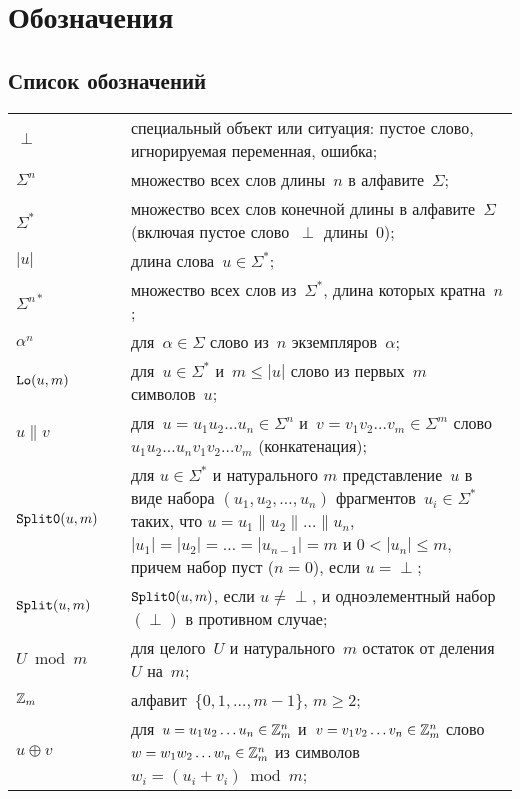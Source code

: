 \chapter{Обозначения}\label{DEFS}

\section{Список обозначений}\label{DEFS.List}

{\tabcolsep 0pt
\begin{longtable}{lrp{13.2cm}}
$\perp$  & \hspace{2mm} &
специальный объект или ситуация: 
пустое слово, игнорируемая переменная, ошибка;
\\[4pt]
%
$\Sigma^n$  &&
множество всех слов длины~$n$ в алфавите~$\Sigma$;
\\[4pt]
%
$\Sigma^*$ &&
множество всех слов конечной длины в алфавите~$\Sigma$
(включая пустое слово~$\perp$ длины~$0$);
\\[4pt]
$|u|$ &&
длина слова~$u\in\Sigma^*$;
\\[4pt]
%
$\Sigma^{n*}$ &&
множество всех слов из~$\Sigma^*$, длина которых кратна~$n$;
\\[4pt]
%
$\alpha^n$ &&
для~$\alpha\in\Sigma$ слово из~$n$ экземпляров~$\alpha$;
\\[4pt]
%
$\mathop{\texttt{Lo}}\nolimits(u,m)$ &&
для~$u\in\Sigma^*$ и~$m\leq|u|$
слово из первых~$m$ символов~$u$;
\\[4pt]
%
$u\parallel v$ &&
для~$u=u_1 u_2\ldots u_n\in\Sigma^n$ 
и~$v=v_1 v_2\ldots v_m\in\Sigma^m$
слово~$u_1 u_2\ldots u_n v_1 v_2\ldots v_m$
(конкатенация);
\\[4pt]
%
$\mathop{\texttt{Split0}}\nolimits(u,m)$ &&
для $u\in\Sigma^*$ и натурального $m$ представление~$u$
в виде набора $(u_1,u_2,\ldots,u_n)$ фрагментов~$u_i\in\Sigma^*$ 
таких, что
$u=u_1\parallel u_2\parallel\ldots\parallel u_n$,
$|u_1|=|u_2|=\ldots=|u_{n-1}|=m$ и $0<|u_n|\leq m$, 
причем набор пуст ($n=0$), если $u=\perp$;
\\[4pt]
%
$\mathop{\texttt{Split}}\nolimits(u,m)$ &&
$\mathop{\texttt{Split0}}\nolimits(u,m)$, если $u\neq\perp$, и одноэлементный 
набор $(\perp)$ в противном случае;
\\[4pt]
%
$U\bmod m$ &&
для целого~$U$ и натурального~$m$ остаток от деления~$U$ на~$m$; 
\\[4pt]
%
$\mathbb{Z}_m$ && 
алфавит~$\{0,1,\ldots,m-1\}$, $m\geq 2$;
\\[4pt]
%
$u\oplus v$ &&
для~$u=u_1 u_2\ldots u_n\in\mathbb{Z}_m^n$ 
и~$v=v_1 v_2\ldots v_n\in\mathbb{Z}_m^n$
слово~$w=w_1 w_2\ldots w_n\in\mathbb{Z}_m^n$
из символов~$w_i=(u_i+v_i)\bmod{m}$;

\end{longtable}}
